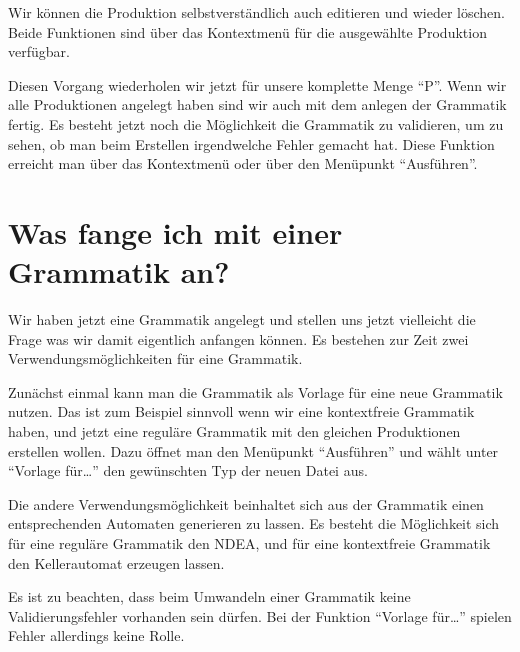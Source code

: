 Wir können die Produktion selbstverständlich auch editieren und wieder löschen.
Beide Funktionen sind über das Kontextmenü für die ausgewählte Produktion
verfügbar.\vspace{10pt}

Diesen Vorgang wiederholen wir jetzt für unsere komplette Menge "`P"'. Wenn wir
alle Produktionen angelegt haben sind wir auch mit dem anlegen der Grammatik
fertig. Es besteht jetzt noch die Möglichkeit die Grammatik zu validieren, um
zu sehen, ob man beim Erstellen irgendwelche Fehler gemacht hat. Diese Funktion
erreicht man über das Kontextmenü oder über den Menüpunkt "`Ausführen"'.

\section{Was fange ich mit einer Grammatik an?}

Wir haben jetzt eine Grammatik angelegt und stellen uns jetzt vielleicht die
Frage was wir damit eigentlich anfangen können. Es bestehen zur Zeit zwei
Verwendungsmöglichkeiten für eine Grammatik.\vspace{10pt}

Zunächst einmal kann man die Grammatik als Vorlage für eine neue Grammatik
nutzen. Das ist zum Beispiel sinnvoll wenn wir eine kontextfreie Grammatik
haben, und jetzt eine reguläre Grammatik mit den gleichen Produktionen
erstellen wollen. Dazu öffnet man den Menüpunkt "`Ausführen"' und wählt unter
"`Vorlage für\ldots"' den gewünschten Typ der neuen Datei aus.\vspace{10pt}

Die andere Verwendungsmöglichkeit beinhaltet sich aus der Grammatik einen
ent\-sprechen\-den Automaten generieren zu lassen. Es besteht die Möglichkeit
sich für eine reguläre Grammatik den NDEA, und für eine kontextfreie Grammatik den Kellerautomat
erzeugen lassen.\vspace{10pt}

Es ist zu beachten, dass beim Umwandeln einer Grammatik keine
Validierungsfehler vorhanden sein dürfen. Bei der Funktion "`Vorlage
für\ldots"' spielen Fehler allerdings keine Rolle.




